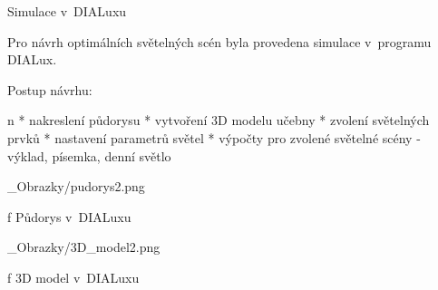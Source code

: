 \chap Simulace v~DIALuxu

Pro návrh optimálních světelných scén byla provedena simulace v~programu DIALux.

\medskip
Postup návrhu:

\begitems \style n
* nakreslení půdorysu
* vytvoření 3D modelu učebny
* zvolení světelných prvků
* nastavení parametrů světel
* výpočty pro zvolené světelné scény - výklad, písemka, denní světlo
\enditems
\medskip

\medskip {}
\picw=8cm _Obrazky/pudorys2.png
\caption/f Půdorys v~DIALuxu
\medskip

\medskip {}
\picw=8cm _Obrazky/3D_model2.png
\caption/f 3D model v~DIALuxu
\medskip
